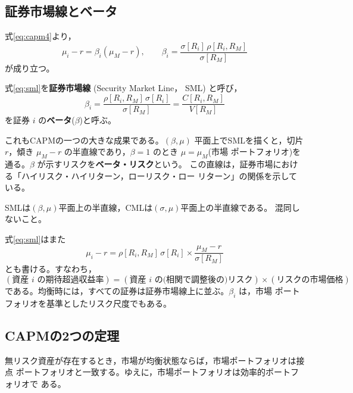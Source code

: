 \subsection{証券市場線とベータ}

式\eqref{eq:capm4}より，
\begin{equation}
\mu_i - r = \beta_i(\mu_M - r),
\qquad
\beta_i = \frac{\sigma[R_i]\,\rho[R_i,R_M]}{\sigma[R_M]}
\label{eq:sml}
\end{equation}
が成り立つ。

\begin{definition}[証券市場線とベータ]
式\eqref{eq:sml}を\textbf{証券市場線} (Security Market Line， SML) と呼び，
\begin{equation}
\beta_i = \frac{\rho[R_i,R_M]\,\sigma[R_i]}{\sigma[R_M]}
= \frac{C[R_i,R_M]}{V[R_M]}
\end{equation}
を証券 $i$ の\textbf{ベータ}($\beta$)と呼ぶ。
\end{definition}

これもCAPMの一つの大きな成果である。$(\beta,\mu)$ 平面上でSMLを描くと，切片
$r$，傾き $\mu_M - r$ の半直線であり，$\beta=1$ のとき $\mu = \mu_M$(市場
ポートフォリオ)を通る。$\beta$ が示すリスクを\textbf{ベータ・リスク}という。
この直線は，証券市場における「ハイリスク・ハイリターン，ローリスク・ロー
リターン」の関係を示している。

\begin{remark}
SMLは$(\beta,\mu)$平面上の半直線，CMLは$(\sigma,\mu)$平面上の半直線である。
混同しないこと。
\end{remark}

式\eqref{eq:sml}はまた
\begin{equation}
\mu_i - r = \rho[R_i,R_M]\,\sigma[R_i] \times \frac{\mu_M - r}{\sigma[R_M]}
\end{equation}
とも書ける。すなわち，
\[
(\text{資産 } i \text{ の期待超過収益率})
= (\text{資産 } i \text{ の(相関で調整後の)リスク})
\times(\text{リスクの市場価格})
\]
である。均衡時には，すべての証券は証券市場線上に並ぶ。$\beta_i$ は，市場
ポートフォリオを基準としたリスク尺度でもある。

\subsection{CAPMの2つの定理}

\begin{theorem}[CAPM第一定理]
無リスク資産が存在するとき，市場が均衡状態ならば，市場ポートフォリオは接点
ポートフォリオと一致する。ゆえに，市場ポートフォリオは効率的ポートフォリオで
ある。
\end{theorem}

